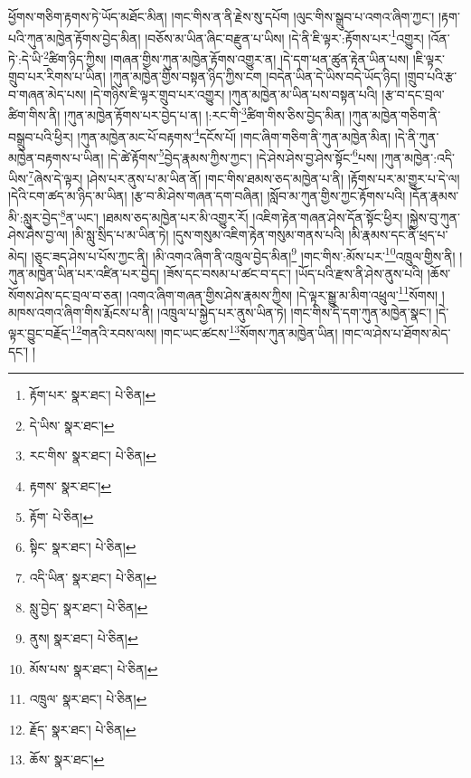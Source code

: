 ཕྱོགས་གཅིག་རྟགས་ཏེ་ཡོད་མཐོང་མིན། །གང་གིས་ན་ནི་རྗེས་སུ་དཔོག །ལུང་གིས་སྒྲུབ་པ་འགའ་ཞིག་ཀྱང་། །རྟག་པའི་ཀུན་མཁྱེན་རྟོགས་བྱེད་མིན། །བཅོས་མ་ཡིན་ཞིང་བརྫུན་པ་ཡིས། །དེ་ནི་ཇི་ལྟར་:རྟོགས་པར་\footnote{རྟོག་པར་  སྣར་ཐང་།  པེ་ཅིན། }འགྱུར། །འོན་ཏེ་:དེ་ཡི་\footnote{དེ་ཡིས་  སྣར་ཐང་། }ཚིག་ཉིད་ཀྱིས། །གཞན་གྱིས་ཀུན་མཁྱེན་རྟོགས་འགྱུར་ན། །དེ་དག་ཕན་ཚུན་རྟེན་ཡིན་པས། །ཇི་ལྟར་གྲུབ་པར་རིགས་པ་ཡིན། །ཀུན་མཁྱེན་གྱིས་བསྟན་ཉིད་ཀྱིས་ངག །བདེན་ཡིན་དེ་ཡིས་བདེ་ཡོད་ཉིད། །གྲུབ་པའི་རྩ་བ་གཞན་མེད་པས། །དེ་གཉིས་ཇི་ལྟར་གྲུབ་པར་འགྱུར། །ཀུན་མཁྱེན་མ་ཡིན་པས་བསྟན་པའི། །རྩ་བ་དང་བྲལ་ཚིག་གིས་ནི། །ཀུན་མཁྱེན་རྟོགས་པར་བྱེད་པ་ན། །:རང་གི་\footnote{རང་གིས་  སྣར་ཐང་།  པེ་ཅིན། }ཚིག་གིས་ཅིས་བྱེད་མིན། །ཀུན་མཁྱེན་གཅིག་ནི་བསྒྲུབ་པའི་ཕྱིར། །ཀུན་མཁྱེན་མང་པོ་བརྟགས་\footnote{རྟགས་  སྣར་ཐང་། }དངོས་པོ། །གང་ཞིག་གཅིག་ནི་ཀུན་མཁྱེན་མིན། །དེ་ནི་ཀུན་མཁྱེན་བརྟགས་པ་ཡིན། །དེ་ཚེ་རྟོགས་\footnote{རྟོག་  པེ་ཅིན། }བྱེད་རྣམས་ཀྱིས་ཀྱང་། །དེ་ཤེས་ཤེས་བྱ་ཤེས་སྟོང་\footnote{སྟིང་  སྣར་ཐང་།  པེ་ཅིན། }པས། །ཀུན་མཁྱེན་:འདི་ཡིས་\footnote{འདི་ཡིན་  སྣར་ཐང་།  པེ་ཅིན། }ཞེས་དེ་ལྟར། །ཤེས་པར་ནུས་པ་མ་ཡིན་ནོ། །གང་གིས་ཐམས་ཅད་མཁྱེན་པ་ནི། །རྟོགས་པར་མ་གྱུར་པ་དེ་ལ། །དེའི་ངག་ཚད་མ་ཉིད་མ་ཡིན། །རྩ་བ་མི་ཤེས་གཞན་དག་བཞིན། །སློབ་མ་ཀུན་གྱིས་ཀྱང་རྟོགས་པའི། །དོན་རྣམས་མི་:སླུར་བྱེད་\footnote{སླུ་བྱེད་  སྣར་ཐང་།  པེ་ཅིན། }ན་ཡང་། །ཐམས་ཅད་མཁྱེན་པར་མི་འགྱུར་རོ། །འཇིག་རྟེན་གཞན་ཤེས་དོན་སྟོང་ཕྱིར། །སྐྱེས་བུ་ཀུན་ཤེས་ཤེས་བྱ་ལ། །མི་སླུ་སྲིད་པ་མ་ཡིན་ཏེ། །དུས་གསུམ་འཇིག་རྟེན་གསུམ་གནས་པའི། །མི་རྣམས་དང་ནི་ཕྲད་པ་མེད། །ཅུང་ཟད་ཤེས་པ་པོས་ཀྱང་ནི། །མི་འགའ་ཞིག་ནི་འཁྲུལ་བྱེད་མིན།\footnote{ནུས།  སྣར་ཐང་།  པེ་ཅིན། } །གང་གིས་:མོས་པར་\footnote{མོས་པས་  སྣར་ཐང་།  པེ་ཅིན། }འཁྲུལ་གྱིས་ནི། །ཀུན་མཁྱེན་ཡིན་པར་འཛིན་པར་བྱེད། །ཟོས་དང་བསམ་པ་ཚང་བ་དང་། །ཡོད་པའི་རྫས་ནི་ཤེས་ནུས་པའི། །ཆོས་སོགས་ཤེས་དང་བྲལ་བ་ཅན། །འགའ་ཞིག་གཞན་གྱིས་ཤེས་རྣམས་ཀྱིས། །དེ་ལྟར་སྒྱུ་མ་མིག་འཕྲུལ་\footnote{འཁྲུལ་  སྣར་ཐང་།  པེ་ཅིན། }སོགས། །མཁས་འགའ་ཞིག་གིས་རྨོངས་པ་ནི། །འཁྲུལ་པ་སྐྱེད་པར་ནུས་ཡིན་ཏེ། །གང་གིས་དེ་དག་ཀུན་མཁྱེན་སྣང་། །དེ་ལྟར་བྱུང་བརྗོད་\footnote{རྗོད་  སྣར་ཐང་།  པེ་ཅིན། }གནའི་རབས་ལས། །གང་ཡང་ཚངས་\footnote{ཆོས་  སྣར་ཐང་། }སོགས་ཀུན་མཁྱེན་ཡིན། །གང་ལ་ཤེས་པ་ཐོགས་མེད་དང་། །
